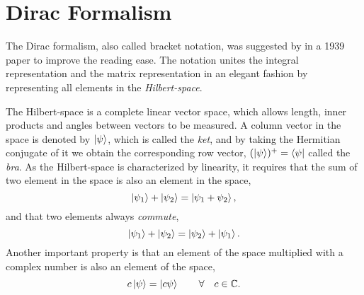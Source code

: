 \chapter{Dirac Formalism} \label{app:dirac}
The Dirac formalism, also called bracket notation, was suggested by \citet{dirac_new_1939} in a 1939 paper to improve the reading ease. The notation unites the integral representation and the matrix representation in an elegant fashion by representing all elements in the \textit{Hilbert-space}. 

The Hilbert-space is a complete linear vector space, which allows length, inner products and angles between vectors to be measured. A column vector in the space is denoted by $\ket{\psi}$, which is called the \textit{ket}, and by taking the Hermitian conjugate of it we obtain the corresponding row vector, $(\ket{\psi})^+=\bra{\psi}$ called the \textit{bra}. As the Hilbert-space is characterized by linearity, it requires that the sum of two element in the space is also an element in the space,
\begin{equation}
\ket{\psi_1}+\ket{\psi_2}=\ket{\psi_1+\psi_2},
\end{equation}
and that two elements always \textit{commute},
\begin{equation}
\ket{\psi_1}+\ket{\psi_2}=\ket{\psi_2}+\ket{\psi_1}.
\end{equation}
Another important property is that an element of the space multiplied with a complex number is also an element of the space,
\begin{equation}
c\ket{\psi}=\ket{c\psi}\quad\quad\forall\quad c\in\mathbb{C}.
\end{equation}

